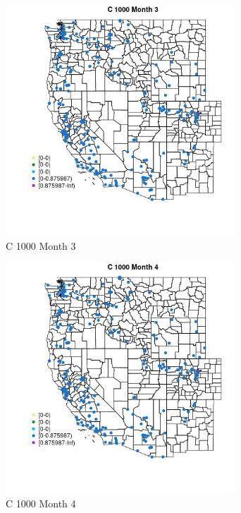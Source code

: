 \begin{figure} 
\centering  
\includegraphics[width=0.77\textwidth]{Code_Outputs/Report_ML_input_PM25_Step4_part_e_de_duplicated_aveswNAs_MapObsMo3C_1000.jpg} 
\caption{\label{fig:Report_ML_input_PM25_Step4_part_e_de_duplicated_aveswNAsMapObsMo3C_1000}C 1000 Month 3} 
\end{figure} 
 

\begin{figure} 
\centering  
\includegraphics[width=0.77\textwidth]{Code_Outputs/Report_ML_input_PM25_Step4_part_e_de_duplicated_aveswNAs_MapObsMo4C_1000.jpg} 
\caption{\label{fig:Report_ML_input_PM25_Step4_part_e_de_duplicated_aveswNAsMapObsMo4C_1000}C 1000 Month 4} 
\end{figure} 
 

